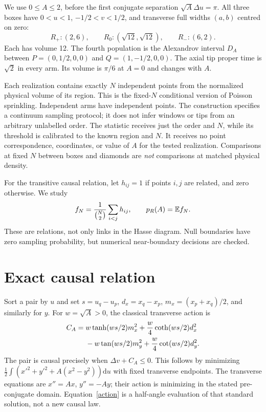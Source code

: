 \documentclass[11pt,a4paper]{article}
\newcommand{\E}{\mathbb E}
\newcommand{\dd}{\mathrm d}
\begin{document}
We use $0\leq A\leq2$, before the first conjugate separation
$\sqrt{A}\Delta u=\pi$. All three boxes have $0<u<1$,
$-1/2<v<1/2$, and transverse full widths $(a,b)$ centred on zero:
\begin{equation}
 R_+:(2,6),\qquad R_0:(\sqrt{12},\sqrt{12}),\qquad R_-:(6,2).
\end{equation}
Each has volume 12. The fourth population is the Alexandrov interval $D_A$
between $P=(0,1/2,0,0)$ and $Q=(1,-1/2,0,0)$. The axial tip proper time is
$\sqrt2$ in every arm. Its volume is $\pi/6$ at $A=0$ and changes with $A$.

Each realization contains exactly $N$ independent points from the normalized
physical volume of its region. This is the fixed-$N$ conditional version of
Poisson sprinkling. Independent arms have independent points. The construction
specifies a continuum sampling protocol; it does not infer windows or tips from
an arbitrary unlabelled order. The statistic receives just the order and $N$,
while its threshold is calibrated to the known region and $N$. It receives no
point correspondence, coordinates, or value of $A$ for the tested realization.
Comparisons at fixed $N$ between boxes and diamonds are \emph{not} comparisons
at matched physical density.

For the transitive causal relation, let $h_{ij}=1$ if points $i,j$ are related,
and zero otherwise. We study
\begin{equation}
 f_N={1\over\binom N2}\sum_{i<j}h_{ij},\qquad
 p_R(A)=\E f_N . \label{f}
\end{equation}
These are relations, not only links in the Hasse diagram. Null boundaries have
zero sampling probability, but numerical near-boundary decisions are checked.

\section{Exact causal relation}
Sort a pair by $u$ and set $s=u_q-u_p$, $d_x=x_q-x_p$,
$m_x=(x_p+x_q)/2$, and similarly for $y$. For $w=\sqrt A>0$, the classical
transverse action is
\begin{align}
 C_A={}&w\tanh(ws/2)m_x^2+{w\over4}\coth(ws/2)d_x^2\nonumber\\
       &-w\tan(ws/2)m_y^2+{w\over4}\cot(ws/2)d_y^2 . \label{action}
\end{align}
The pair is causal precisely when $\Delta v+C_A\leq0$. This follows by
minimizing $\tfrac12\int(x'^2+y'^2+A(x^2-y^2))\dd u$ with fixed transverse
endpoints. The transverse equations are $x''=Ax$, $y''=-Ay$; their action is
minimizing in the stated pre-conjugate domain. Equation~\eqref{action} is a
half-angle evaluation of that standard solution, not a new causal law.
\end{document}
